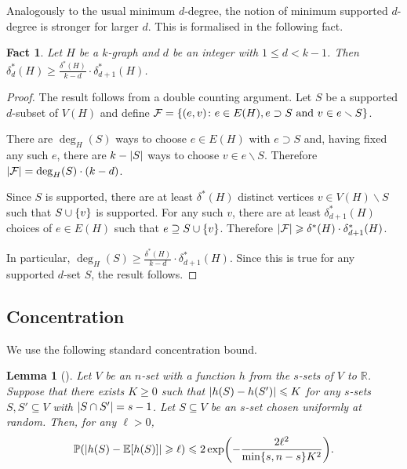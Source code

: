 \documentclass[12pt,reqno]{amsart}
\theoremstyle{plain}
\newtheorem{lemma}[theorem]{Lemma}
\newtheorem{fact}[theorem]{Fact}
\theoremstyle{definition}
\numberwithin{equation}{section}
\newcommand{\Prob}{\mathbb{P}}
\newcommand{\Exp}{\mathbb{E}}
\DeclarePairedDelimiter{\abs}{\lvert}{\rvert}
\DeclarePairedDelimiter{\set}{\{}{\}}
\renewcommand{\ge}{\geqslant}
\renewcommand{\le}{\leqslant}
\renewcommand{\geq}{\geqslant}
\renewcommand{\leq}{\leqslant}
\renewcommand{\setminus}{\smallsetminus}
\renewcommand{\subset}{\subseteq}
\newcommand{\comin}{\delta^{\ast}}
\newcommand{\bR}{\mathbb{R}}
\newcommand{\cF}{\mathcal{F}}
\begin{document}
	Analogously to the usual minimum $d$-degree, the notion of minimum supported $d$-degree is stronger for larger $d$.
	This is formalised in the following fact.
	
	\begin{fact}\label{claim:supported_minimum_degree}
		Let $H$ be a $k$-graph and $d$ be an integer with $1 \le d < k - 1$.
		Then $\comin_d(H) \ge \frac{\comin(H)}{k-d} \cdot \comin_{d+1}(H)$.
	\end{fact}
	
	\begin{proof}
		The result follows from a double counting argument.
		Let $S$ be a supported $d$-subset of $V(H)$ and define $\cF = \set{(e,v) \colon e \in E(H), e \supset S \text{ and } v \in e \setminus S}$.
		
		There are $\deg_H(S)$ ways to choose $e \in E(H)$ with $e \supset S$ and, having fixed any such $e$, there are $k - \abs{S}$ ways to choose $v \in e \setminus S$.
		Therefore $\abs{\cF} = \deg_H(S) \cdot (k-d)$.
		
		Since $S$ is supported, there are at least $\comin(H)$ distinct vertices $v \in V(H) \setminus S$ such that $S \cup \set{v}$ is supported.
		For any such $v$, there are at least $\comin_{d+1}(H)$ choices of $e \in E(H)$ such that $e \supseteq S \cup \set{v}$.
		Therefore $\abs{\cF} \ge \comin(H) \cdot \comin_{d+1}(H)$.
		
		In particular, $\deg_H(S) \ge \frac{\comin(H)}{k-d} \cdot \comin_{d+1}(H)$.
		Since this is true for any supported $d$-set $S$, the result follows.
	\end{proof}
	
	\subsection{Concentration}
	
	We use the following standard concentration bound.
	\begin{lemma}[{\cite[Cor.~2.2]{concentration}}]\label{lem:concentration}
		Let $V$ be an $n$-set with a function $h$ from the $s$-sets of $V$ to $\bR$.
		Suppose that there exists $K \geq 0$ such that $\abs{h(S)-h(S')} \le K$ for any $s$-sets $S, S' \subset V$ with $\abs{S \cap S'} = s-1$.
		Let $S \subset V$ be an $s$-set chosen uniformly at random.
		Then, for any $\ell >0$,
		\begin{equation*}
			\Prob(\abs{h(S) - \Exp [h(S)]} \geq \ell) \leq 2 \exp\biggl(-\frac{2 \ell^2}{\min\set{s, n-s} K^2}\biggr).
		\end{equation*}
	\end{lemma}
	
\end{document}
